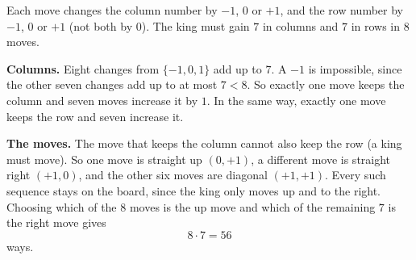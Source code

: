 Each move changes the column number by $-1$, $0$ or $+1$, and the row number by $-1$, $0$ or $+1$ (not both by $0$). The king must gain $7$ in columns and $7$ in rows in $8$ moves.

\textbf{Columns.} Eight changes from $\{-1,0,1\}$ add up to $7$. A $-1$ is impossible, since the other seven changes add up to at most $7<8$. So exactly one move keeps the column and seven moves increase it by $1$. In the same way, exactly one move keeps the row and seven increase it.

\textbf{The moves.} The move that keeps the column cannot also keep the row (a king must move). So one move is straight up $(0,+1)$, a different move is straight right $(+1,0)$, and the other six moves are diagonal $(+1,+1)$. Every such sequence stays on the board, since the king only moves up and to the right. Choosing which of the $8$ moves is the up move and which of the remaining $7$ is the right move gives
\[8\cdot7=\boxed{56}\]
ways.
